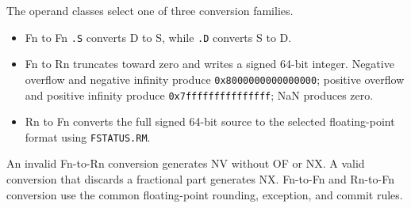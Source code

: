 The operand classes select one of three conversion families.

\begin{itemize}
\item Fn to Fn \texttt{.S} converts D to S, while \texttt{.D} converts S to D.
\item Fn to Rn truncates toward zero and writes a signed 64-bit integer. Negative overflow and negative infinity
produce \texttt{0x8000000000000000}; positive overflow and positive infinity produce
\texttt{0x7fffffffffffffff}; NaN produces zero.
\item Rn to Fn converts the full signed 64-bit source to the selected floating-point format using
\texttt{FSTATUS.RM}.
\end{itemize}
An invalid Fn-to-Rn conversion generates NV without OF or NX. A valid conversion that discards a fractional part
generates NX. Fn-to-Fn and Rn-to-Fn conversion use the common floating-point rounding, exception, and commit rules.
